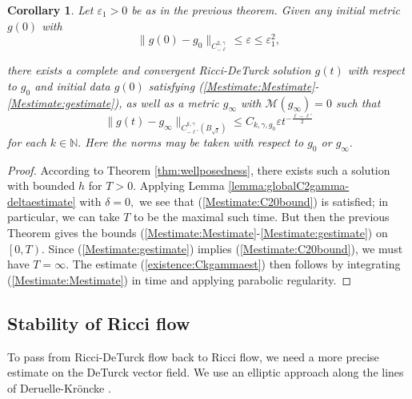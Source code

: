\documentclass[12pt]{amsart}
\newcommand{\calM}{\mathcal{M}}
\newcommand{\N}{{\mathbb N}}
\renewcommand{\1}{{\mathbf 1}}
\newcommand{\eps}{{\varepsilon}}
\newtheorem{cor}[thm]{Corollary}
\theoremstyle{others}
\numberwithin{equation}{section}
\begin{document}
    
    \begin{cor}\label{cor:existence}
    Let $\eps_1 > 0$ be as in the previous theorem. Given any initial metric $g(0)$ with
        \begin{equation}
        \| g(0) - g_0 \|_{C^{2, \gamma}_{-\ell}} \leq \eps \leq \eps_1^2,
    \end{equation}

    there exists a complete and convergent Ricci-DeTurck solution $g(t)$ with respect to $g_0$ and initial data $g(0)$
    satisfying (\ref{Mestimate:Mestimate}-\ref{Mestimate:gestimate}), as well as a metric $g_\infty$ with $\calM(g_\infty) = 0$ such that
    \begin{equation}\label{existence:Ckgammaest}
        \| g(t) - g_\infty \|_{C^{k,\gamma}_{-\ell'}(B_{\sqrt{t}})} \leq C_{k,\gamma, g_0} \eps t^{-\frac{\ell - \ell'}{2}}
    \end{equation}
    for each $k \in \N.$ Here the norms may be taken with respect to $g_0$ or $g_\infty.$
\end{cor}
\begin{proof}
    According to Theorem \ref{thm:wellposedness}, there exists such a solution with bounded $h$ for $T > 0.$ Applying Lemma \ref{lemma:globalC2gamma-deltaestimate} with $\delta = 0,$ we see that (\ref{Mestimate:C20bound}) is satisfied; in particular, we can take $T$ to be the maximal such time. But then the previous Theorem gives the bounds (\ref{Mestimate:Mestimate}-\ref{Mestimate:gestimate}) on $ \left[ 0, T \right).$ Since (\ref{Mestimate:gestimate}) implies (\ref{Mestimate:C20bound}), we must have $T = \infty.$ The estimate (\ref{existence:Ckgammaest}) then follows by integrating (\ref{Mestimate:Mestimate}) in time and applying parabolic regularity.
\end{proof}



\subsection{Stability of Ricci flow}

To pass from Ricci-DeTurck flow back to Ricci flow, we need a more precise estimate on the DeTurck vector field. We use an elliptic approach along the lines of Deruelle-Kr\"oncke \cite[Prop. 2.6]{DeruelleKroncke20}.
\end{document}
